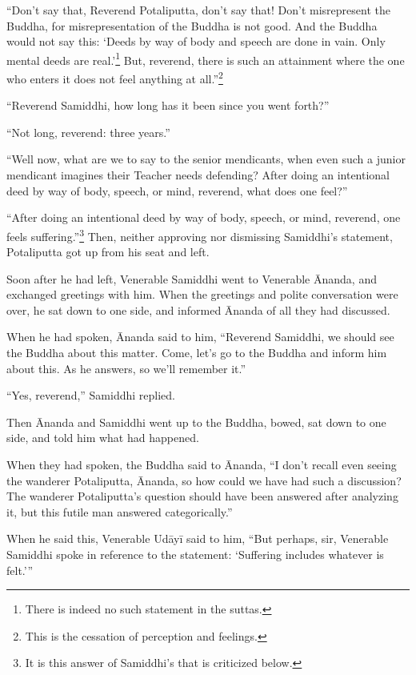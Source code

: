 \documentclass[12pt,openany]{book}%
\begin{document}
“Don’t say that, Reverend Potaliputta, don’t say that! Don’t misrepresent the Buddha, for misrepresentation of the Buddha is not good. And the Buddha would not say this: ‘Deeds by way of body and speech are done in vain. Only mental deeds are real.’\footnote{There is indeed no such statement in the suttas. } But, reverend, there is such an attainment where the one who enters it does not feel anything at all.”\footnote{This is the cessation of perception and feelings. } 

“Reverend Samiddhi, how long has it been since you went forth?” 

“Not long, reverend: three years.” 

“Well now, what are we to say to the senior mendicants, when even such a junior mendicant imagines their Teacher needs defending? After doing an intentional deed by way of body, speech, or mind, reverend, what does one feel?” 

“After doing an intentional deed by way of body, speech, or mind, reverend, one feels suffering.”\footnote{It is this answer of Samiddhi’s that is criticized below. } Then, neither approving nor dismissing Samiddhi’s statement, Potaliputta got up from his seat and left. 

Soon after he had left, Venerable Samiddhi went to Venerable Ānanda, and exchanged greetings with him. When the greetings and polite conversation were over, he sat down to one side, and informed Ānanda of all they had discussed. 

When he had spoken, Ānanda said to him, “Reverend Samiddhi, we should see the Buddha about this matter. Come, let’s go to the Buddha and inform him about this. As he answers, so we’ll remember it.” 

“Yes, reverend,” Samiddhi replied. 

Then Ānanda and Samiddhi went up to the Buddha, bowed, sat down to one side, and told him what had happened. 

When they had spoken, the Buddha said to Ānanda, “I don’t recall even seeing the wanderer Potaliputta, Ānanda, so how could we have had such a discussion? The wanderer Potaliputta’s question should have been answered after analyzing it, but this futile man answered categorically.” 

When he said this, Venerable \textsanskrit{Udāyī} said to him, “But perhaps, sir, Venerable Samiddhi spoke in reference to the statement: ‘Suffering includes whatever is felt.’” 
\end{document}
